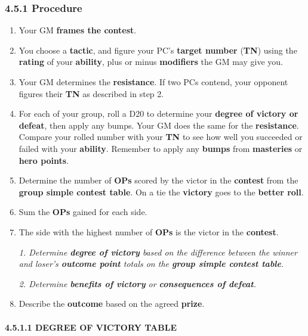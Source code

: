 \documentclass[
]{article}
\begin{document}
\hypertarget{procedure-2}{%
\subsubsection{4.5.1 Procedure}\label{procedure-2}}

\begin{enumerate}
\def\labelenumi{\arabic{enumi}.}
\item
  Your GM \textbf{frames the contest}.
\item
  You choose a \textbf{tactic}, and figure your PC's \textbf{target
  number} (\textbf{TN}) using the \textbf{rating} of your
  \textbf{ability}, plus or minus \textbf{modifiers} the GM may give
  you.
\item
  Your GM determines the \textbf{resistance}. If two PCs contend, your
  opponent figures their \textbf{TN} as described in step 2.
\item
  For each of your group, roll a D20 to determine your \textbf{degree of
  victory or defeat}, then apply any bumps. Your GM does the same for
  the \textbf{resistance}. Compare your rolled number with your
  \textbf{TN} to see how well you succeeded or failed with your
  \textbf{ability}. Remember to apply any \textbf{bumps} from
  \textbf{masteries} or \textbf{hero points}.
\item
  Determine the number of \textbf{OPs} scored by the victor in the
  \textbf{contest} from the \textbf{group simple contest table}. On a
  tie the \textbf{victory} goes to the \textbf{better roll}.
\item
  Sum the \textbf{OPs} gained for each side.
\item
  The side with the highest number of \textbf{OPs} is the victor in the
  \textbf{contest}.

  \emph{1. Determine \textbf{degree of victory} based on the difference
  between the winner and loser's \textbf{outcome point} totals on the
  \textbf{group simple contest table}.}

  \emph{2. Determine \textbf{benefits of victory} or
  \textbf{consequences of defeat}.}
\item
  Describe the \textbf{outcome} based on the agreed \textbf{prize}.
\end{enumerate}

\hypertarget{degree-of-victory-table}{%
\paragraph{4.5.1.1 DEGREE OF VICTORY
TABLE}\label{degree-of-victory-table}}
\end{document}
